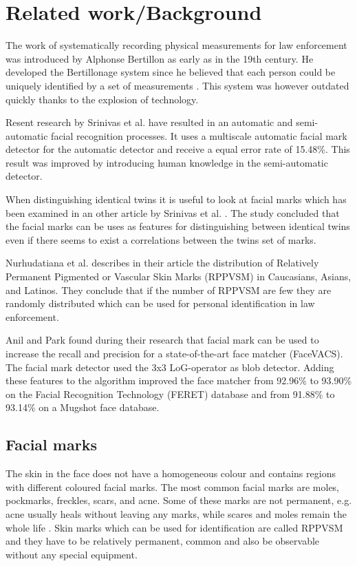 \section{Related work/Background }
The work of systematically recording physical measurements for law enforcement was introduced by Alphonse Bertillon as early as in the 19th century. He developed the Bertillonage system since he believed that each person could be uniquely identified by a set of measurements \cite{Bertillon}. This system was however outdated quickly thanks to the explosion of technology.

Resent research by Srinivas et al. \cite{automatic_detector_2015} have resulted in an automatic and semi-automatic facial recognition processes. It uses a multiscale automatic facial mark detector for the automatic detector and receive a equal error rate of 15.48\%. This result was improved by introducing human knowledge in the semi-automatic detector.

When distinguishing identical twins it is useful to look at facial marks which has been examined in an other article by Srinivas et al. \cite{twins}. The study concluded that the facial marks can be uses as features for distinguishing between identical twins even if there seems to exist a correlations between the twins set of marks.

Nurhudatiana et al. \cite{statistic_RPPVSM} describes in their article the distribution of Relatively Permanent Pigmented or Vascular Skin Marks (RPPVSM) in Caucasians, Asians, and Latinos. They conclude that if the number of RPPVSM are few they are randomly distributed which can be used for personal identification in law enforcement. 

Anil and Park found during their research \cite{jain_facial} that facial mark can be used to increase the recall and precision for a state-of-the-art face matcher (FaceVACS). The facial mark detector used the 3x3 LoG-operator as blob detector. Adding these features to the algorithm improved the face matcher from  92.96\% to 93.90\% on the Facial Recognition Technology (FERET) database and from 91.88\% to 93.14\% on a Mugshot face database. 




\subsection{Facial marks}
The skin in the face does not have a homogeneous colour and contains regions with different coloured facial marks. The most common facial marks are moles, pockmarks, freckles, scars, and acne. Some of these marks are not permanent, e.g. acne usually heals without leaving any marks, while scares and moles remain the whole life    \cite{automatic_detector_2015}. Skin marks which can be used for identification are called RPPVSM and they have to be relatively permanent, common and also be observable without any special equipment. \cite{statistic_RPPVSM}